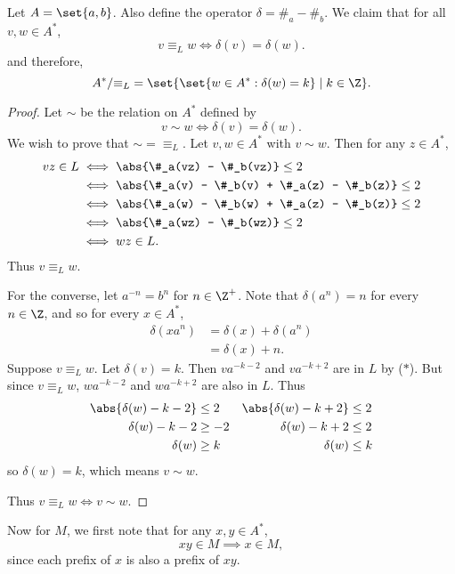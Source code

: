 \documentclass[12pt]{article}
\begin{document}
\begin{solution}
    Let $A = \set{a, b}$.
    Also define the operator $\delta = \#_a - \#_b$.
    We claim that for all $v, w \in A^*$, \[
        v \equiv_L w \iff \delta(v) = \delta(w).
    \] and therefore, \[
        A^*/{\equiv_L} = \set{\set{w \in A^* : \delta(w) = k} \mid k \in \Z}.
    \]
    \begin{proof}
        Let $\sim$ be the relation on $A^*$ defined by \[
            v \sim w \iff \delta(v) = \delta(w).
        \] We wish to prove that ${\sim} = {\equiv_L}$.
        Let $v, w \in A^*$ with $v \sim w$.
        Then for any $z \in A^*$, \begin{align*}
            vz \in L &\iff \abs{\#_a(vz) - \#_b(vz)} \le 2 \\
            &\iff \abs{\#_a(v) - \#_b(v) + \#_a(z) - \#_b(z)} \le 2 \\
            &\iff \abs{\#_a(w) - \#_b(w) + \#_a(z) - \#_b(z)} \le 2 \\
            &\iff \abs{\#_a(wz) - \#_b(wz)} \le 2 \\
            &\iff wz \in L.
        \end{align*}
        Thus $v \equiv_L w$.

        For the converse, let $a^{-n} = b^n$ for $n \in \Z^+$.
        Note that $\delta(a^n) = n$ for every $n \in \Z$,
        and so for every $x \in A^*$, \begin{align*}
            \delta(xa^n) &= \delta(x) + \delta(a^n) \\
            &= \delta(x) + n.
        \end{align*}
        Suppose $v \equiv_L w$.
        Let $\delta(v) = k$.
        Then $va^{-k-2}$ and $va^{-k+2}$ are in $L$ by ($*$).
        But since $v \equiv_L w$, $wa^{-k-2}$ and $wa^{-k+2}$ are also in $L$.
        Thus \begin{align*}
            \abs{\delta(w) - k - 2} &\le 2
                & \abs{\delta(w) - k + 2} &\le 2 \\
            \delta(w) - k - 2 &\ge -2
                & \delta(w) - k + 2 &\le 2 \\
            \delta(w) &\ge k
                & \delta(w) &\le k
        \end{align*}
        so $\delta(w) = k$, which means $v \sim w$.

        Thus $v \equiv_L w \iff v \sim w$.
    \end{proof}

    Now for $M$, we first note that for any $x, y \in A^*$, \begin{equation*}
        xy \in M \implies x \in M, \tag{$\dagger$} \label{eq:prefix}
    \end{equation*} since each prefix of $x$ is also a prefix of $xy$.


\end{solution}
\end{document}
